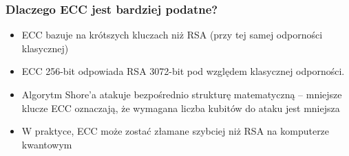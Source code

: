 \begin{frame}
    \frametitle{Dlaczego ECC jest bardziej podatne?}
    \begin{itemize}
        \item ECC bazuje na krótszych kluczach niż RSA (przy tej samej odporności klasycznej)
        \item ECC 256-bit odpowiada RSA 3072-bit pod względem klasycznej odporności.
        \item Algorytm Shore'a atakuje bezpośrednio strukturę matematyczną – mniejsze klucze ECC oznaczają, że wymagana liczba kubitów do ataku jest mniejsza
        \item W praktyce, ECC może zostać złamane szybciej niż RSA na komputerze kwantowym
    \end{itemize}
\end{frame}








